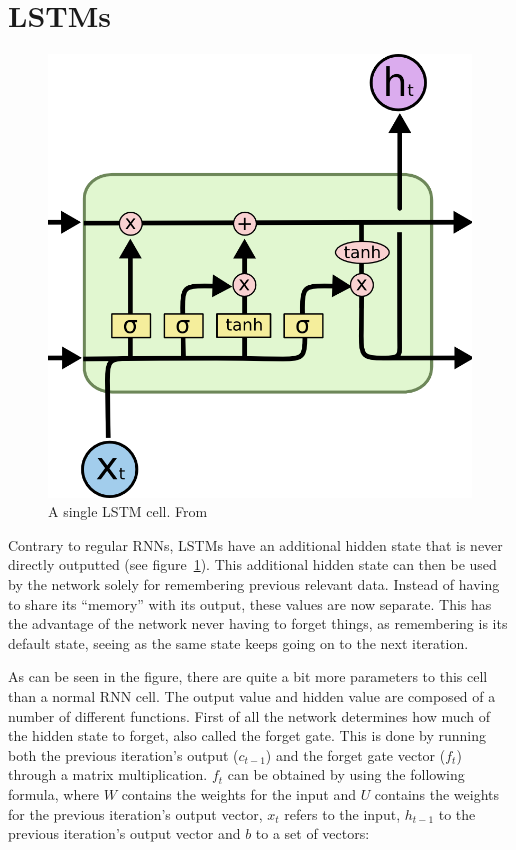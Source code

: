 \section{LSTMs}

\begin{figure}
	\begin{center}
		\includegraphics[scale=0.5]{rnn/lstm_cell}
	\end{center}
	\caption{A single LSTM cell. From~\cite{LSTMCell2015}\label{fig:lstm_cell}}
\end{figure}

Contrary to regular RNNs, LSTMs have an additional hidden state that is never directly outputted (see figure~\ref{fig:lstm_cell}). This additional hidden state can then be used by the network solely for remembering previous relevant data. Instead of having to share its \enquote{memory} with its output, these values are now separate. This has the advantage of the network never having to forget things, as remembering is its default state, seeing as the same state keeps going on to the next iteration.

As can be seen in the figure, there are quite a bit more parameters to this cell than a normal RNN cell. The output value and hidden value are composed of a number of different functions. First of all the network determines how much of the hidden state to forget, also called the forget gate. This is done by running both the previous iteration's output (\(c_{t-1}\)) and the forget gate vector (\(f_t\)) through a matrix multiplication. \(f_t\) can be obtained by using the following formula, where \(W\) contains the weights for the input and \(U\) contains the weights for the previous iteration's output vector, \(x_t\) refers to the input, \(h_{t-1}\) to the previous iteration's output vector and \(b\) to a set of vectors:

